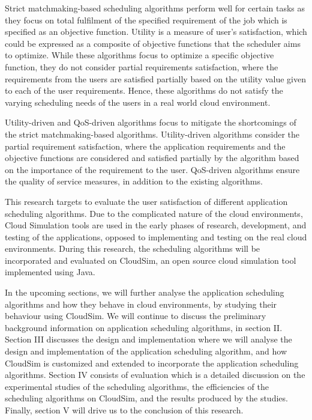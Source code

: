 \documentclass[times, 10pt,twocolumn]{article}
\begin{document}
Strict matchmaking-based scheduling algorithms perform well for certain tasks as they focus on total fulfilment of the specified requirement of the job which is specified as an objective function. Utility is a measure of user's satisfaction, which could be expressed as a composite of objective functions that the scheduler aims to optimize. While these algorithms focus to optimize a specific objective function, they do not consider partial requirements satisfaction, where the requirements from the users are satisfied partially based on the utility value given to each of the user requirements\cite{resumo}. Hence, these algorithms do not satisfy the varying scheduling needs of the users in a real world cloud environment.

Utility-driven and QoS-driven algorithms focus to mitigate the shortcomings of the strict matchmaking-based algorithms. Utility-driven algorithms consider the partial requirement satisfaction, where the application requirements and the objective functions are considered and satisfied partially by the algorithm based on the importance of the requirement to the user. QoS-driven algorithms ensure the quality of service measures, in addition to the existing algorithms. 

This research targets to evaluate the user satisfaction of different application scheduling algorithms. Due to the complicated nature of the cloud environments, Cloud Simulation tools are used in the early phases of research, development, and testing of the applications, opposed to implementing and testing on the real cloud environments. During this research, the scheduling algorithms will be incorporated and evaluated on CloudSim\cite{cloudsim}, an open source cloud simulation tool implemented using Java. 

In the upcoming sections, we will further analyse the application scheduling algorithms and how they behave in cloud environments, by studying their behaviour using CloudSim. We will continue to discuss the preliminary background information on application scheduling algorithms, in section II. Section III discusses the design and implementation where we will analyse the design and implementation of the application scheduling algorithm, and how CloudSim is customized and extended to incorporate the application scheduling algorithms. Section IV consists of evaluation which is a detailed discussion on the experimental studies of the scheduling algorithms, the efficiencies of the scheduling algorithms on CloudSim, and the results produced by the studies. Finally, section V will drive us to the conclusion of this research.
\end{document}
